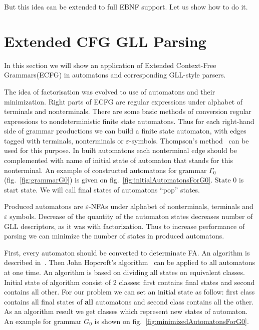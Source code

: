 \documentclass[runningheads,a4paper]{llncs}
\begin{document}
But this idea can be extended to full EBNF support.
Let us show how to do it.


\section{Extended CFG GLL Parsing}%

In this section we will show an application of Extended Context-Free Grammars(ECFG) in automatons and corresponding GLL-style parsers.

The idea of factorisation was evolved to use of automatons and their minimization.
Right parts of ECFG are regular expressions under alphabet of terminals and nonterminals.
There are some basic methods of conversion regular expressions to nondeterministic finite state automatons. 
Thus for each right-hand side of grammar productions we can build a finite state automaton, with edges tagged with 
terminals, nonterminals or $\varepsilon$-symbols. Thompson's method~\cite{Thompson:1968:PTR:363347.363387} can be used for this purpose. 
In built automatons each nonterminal edge should be complemented with name of initial state of automaton that stands 
for this nonterminal. An example of constructed automatons for grammar $\Gamma_{0}$(fig.~\ref{fig:grammarG0}) is given on fig.~\ref{fig:initialAutomatonsForG0}. State 0 is start state.
We will call final states of automatons ``pop'' states.

Produced automatons are $\varepsilon$-NFAs under alphabet of nonterminals, terminals and $\varepsilon$ symbols.
Decrease of the quantity of the automaton states decreases number of GLL descriptors, as it was with factorization.
Thus to increase performance of parsing we can minimize the number of states in produced automatons.

First, every automaton should be converted to determinate FA. An algorithm is described in~\cite{aho1974design}.
Then John Hopcroft's algorithm~\cite{hopcroft1971n} can be applied to all automatons at one time. 
An algorithm is based on dividing all states on equivalent classes. Initial state of algorithm consist 
of 2 classes: first contains final states and second contains all other. For our problem we can set an 
initial state as follow: first class contains all final states of \textbf{all} automatons and second class 
contains all the other. As an algorithm result we get classes which represent new states of automaton. 
An example for grammar $G_0$ is shown on fig.~\ref{fig:minimizedAutomatonsForG0}.
\end{document}
